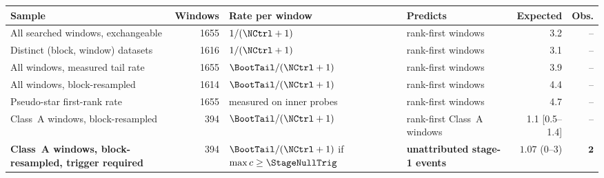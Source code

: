 \begin{tabular}{@{}p{}rp{}p{}rr@{}}
\toprule
Sample & Windows & Rate per window & Predicts & Expected & Obs. \\
\midrule
All searched windows, exchangeable & 1655 & $1/(\NCtrl+1)$ & rank-first windows & 3.2 & -- \\
Distinct (block, window) datasets & 1616 & $1/(\NCtrl+1)$ & rank-first windows & 3.1 & -- \\
All windows, measured tail rate & 1655 & $\BootTail/(\NCtrl+1)$ & rank-first windows & 3.9 & -- \\
All windows, block-resampled & 1614 & $\BootTail/(\NCtrl+1)$ & rank-first windows & 4.4 & -- \\
Pseudo-star first-rank rate & 1655 & measured on inner probes & rank-first windows & 4.7 & -- \\
Class~A windows, block-resampled & 394 & $\BootTail/(\NCtrl+1)$ & rank-first Class~A windows & 1.1 [0.5--1.4] & -- \\
\textbf{Class~A windows, block-resampled, trigger required} & 394 & $\BootTail/(\NCtrl+1)$ if $\max c\geq\StageNullTrig$ & \textbf{unattributed stage-1 events} & $\mathbf{1.07}$ (0--3) & $\mathbf{2}$ \\
\bottomrule
\end{tabular}
